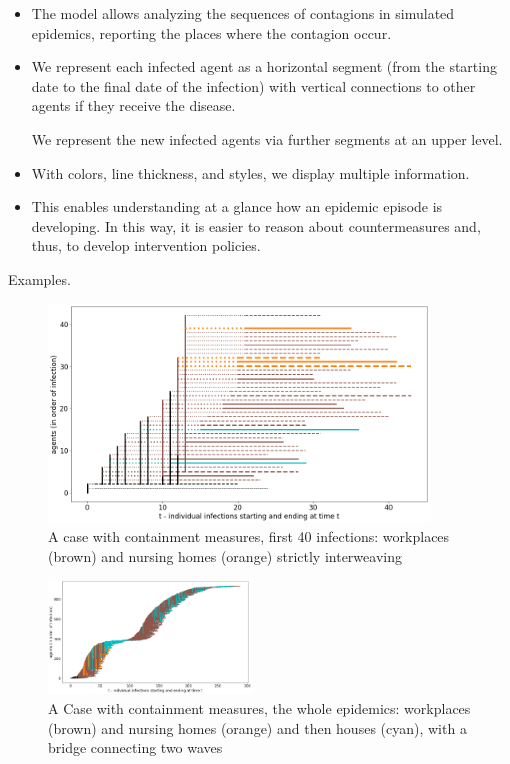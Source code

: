 \documentclass[graybox]{svmult}
\begin{document}
  \begin{itemize}
  \item
The model allows analyzing the sequences of contagions in simulated epidemics, reporting the places where the contagion occur. 
  \item
We represent each infected agent as a horizontal segment (from the starting date to the final date of the infection) with vertical connections to other agents if they receive the disease.

We represent the new infected agents via further segments at an upper level. 

  \item
With colors, line thickness, and styles, we display multiple information. 

  \item
This enables understanding at a glance how an epidemic episode is developing. In this way, it is easier to reason about countermeasures and, thus, to develop intervention policies.

  \end{itemize}

Examples.

\begin{figure}[t]
\center
\includegraphics[width=0.9\textwidth]{with8b40.png}%
\caption{A case with containment measures, first 40 infections: workplaces (brown) and nursing homes (orange) strictly interweaving}
\label{workplacesNursingHomes}
\end{figure}


\begin{figure}[t]
\center
\includegraphics[width=0.48\textwidth]{with8a.png}%
\caption{A Case with containment measures, the whole epidemics: workplaces (brown) and nursing homes (orange) and then houses (cyan), with a bridge connecting two waves}
\label{workplacesNursingHomesFull}
\end{figure}
\end{document}
